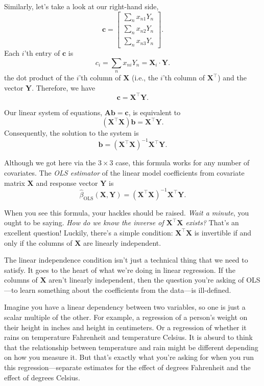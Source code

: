 \documentclass[
  12pt,
  oneside,openany]{book}
\begin{document}
Similarly, let's take a look at our right-hand side,
\[
\mathbf{c} = \begin{bmatrix}
\sum_n x_{n1} Y_n \\
\sum_n x_{n2} Y_n \\
\sum_n x_{n3} Y_n
\end{bmatrix}.
\]
Each \(i\)'th entry of \(\mathbf{c}\) is
\[
c_i = \sum_n x_{ni} Y_n = \mathbf{X}_i \cdot \mathbf{Y}.
\]
the dot product of the \(i\)'th column of \(\mathbf{X}\) (i.e., the \(i\)'th column of \(\mathbf{X}^\top\)) and the vector \(\mathbf{Y}\). Therefore, we have
\[
\mathbf{c} = \mathbf{X}^\top \mathbf{Y}.
\]

Our linear system of equations, \(\mathbf{A} \mathbf{b} = \mathbf{c}\), is equivalent to
\[
(\mathbf{X}^\top \mathbf{X}) \mathbf{b} = \mathbf{X}^\top \mathbf{Y}.
\]
Consequently, the solution to the system is
\[
\mathbf{b} = (\mathbf{X}^\top \mathbf{X})^{-1} \mathbf{X}^\top \mathbf{Y}.
\]

Although we got here via the \(3 \times 3\) case, this formula works for any number of covariates. The \emph{OLS estimator} of the linear model coefficients from covariate matrix \(\mathbf{X}\) and response vector \(\mathbf{Y}\) is
\[
\hat{\beta}_{\text{OLS}}(\mathbf{X}, \mathbf{Y})
= (\mathbf{X}^\top \mathbf{X})^{-1} \mathbf{X}^\top \mathbf{Y}.
\]

When you see this formula, your hackles should be raised. \emph{Wait a minute}, you ought to be saying. \emph{How do we know the inverse of \(\mathbf{X}^\top \mathbf{X}\) exists?} That's an excellent question! Luckily, there's a simple condition: \(\mathbf{X}^\top \mathbf{X}\) is invertible if and only if the columns of \(\mathbf{X}\) are linearly independent.

The linear independence condition isn't just a technical thing that we need to satisfy. It goes to the heart of what we're doing in linear regression. If the columns of \(\mathbf{X}\) aren't linearly independent, then the question you're asking of OLS---to learn something about the coefficients from the data---is ill-defined.

Imagine you have a linear dependency between two variables, so one is just a scalar multiple of the other. For example, a regression of a person's weight on their height in inches and height in centimeters. Or a regression of whether it rains on temperature Fahrenheit and temperature Celsius. It is absurd to think that the relationship between temperature and rain might be different depending on how you measure it. But that's exactly what you're asking for when you run this regression---separate estimates for the effect of degrees Fahrenheit and the effect of degrees Celsius.
\end{document}
